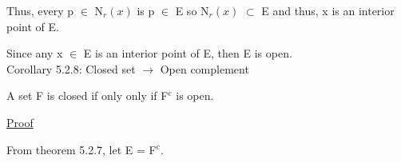 	Thus, every p $\in$ N$_r(x)$ is p $\in$ E so N$_r(x)$ $\subset$ E and thus,
	x is an interior point of E.

	Since any x $\in$ E is an interior point of E, then E is open. \\

{ \color{orange} Corollary 5.2.8: Closed set $\rightarrow$ Open complement } 

	\begin{adjustbox}{minipage=14cm, right}
		A set F is closed if only only if F$^\text{c}$ is open.
	\end{adjustbox}

{ \color{magenta} \underline{Proof} } 

	From {\color{red} theorem 5.2.7}, let E = F$^\text{c}$. \\


























\subsection{}











































